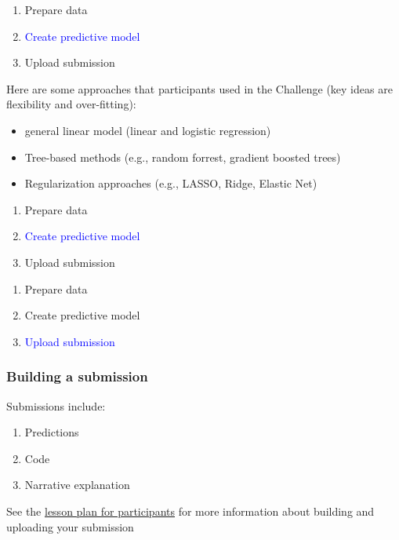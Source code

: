 \documentclass[aspectratio=169]{beamer}
\begin{document}
\begin{frame}

\begin{enumerate}
\item Prepare data
\item \textcolor{blue}{Create predictive model}
\item Upload submission
\end{enumerate}

\end{frame}
\begin{frame}
Here are some approaches that participants used in the Challenge (key ideas are flexibility and over-fitting):

\begin{itemize}
\item general linear model (linear and logistic regression)
\item Tree-based methods (e.g., random forrest, gradient boosted trees)
\item Regularization approaches (e.g., LASSO, Ridge, Elastic Net)
\end{itemize}

\end{frame}
\begin{frame}

\begin{enumerate}
\item Prepare data
\item \textcolor{blue}{Create predictive model}
\item Upload submission
\end{enumerate}

\end{frame}
\begin{frame}

\begin{enumerate}
\item Prepare data
\item Create predictive model
\item \textcolor{blue}{Upload submission}
\end{enumerate}

\end{frame}
\begin{frame}
\frametitle{Building a submission}

Submissions include:
\begin{enumerate}
\item Predictions
\item Code
\item Narrative explanation
\end{enumerate}

\vfill
See the \href{https://github.com/compsocialscience/summer-institute/blob/master/2020/materials/day5-mass-collaboration/activity/lesson_plan_masscollaboration_participant.md}{lesson plan for participants} for more information about building and uploading your submission

\end{frame}
\end{document}
